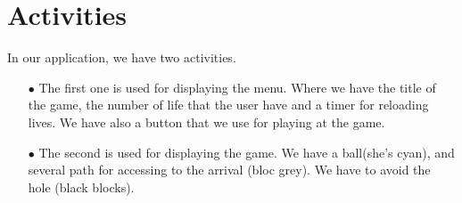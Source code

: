\section{Activities}
In our application, we have two activities.

\begin{itemize}
\item[$\bullet$] The first one is used for displaying the menu. Where we have the title of the game, the number of life that the user have and a timer for reloading lives. We have also a button that we use for playing at the game.
\item[$\bullet$]  The second  is used for displaying the game. We have a ball(she's cyan), and several path for accessing to the arrival (bloc grey). We have to avoid the hole (black blocks).
\end{itemize}
